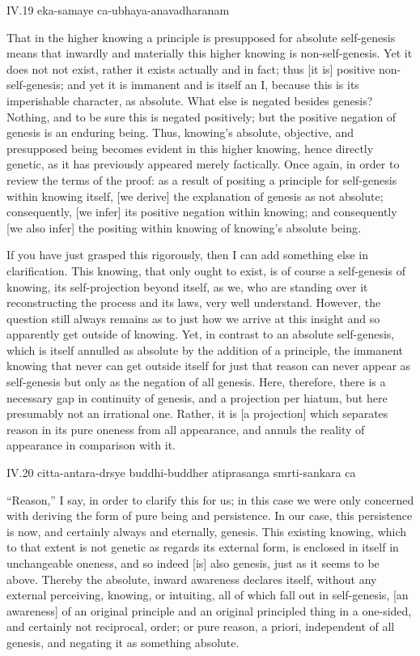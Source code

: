 IV.19
eka-samaye ca-ubhaya-anavadharanam

That in the higher knowing
a principle is presupposed for absolute self-genesis
means that inwardly and materially
this higher knowing is non-self-genesis.
Yet it does not not exist,
rather it exists actually and in fact;
thus [it is] positive non-self-genesis;
and yet it is immanent and is itself an I,
because this is its imperishable character, as absolute.
What else is negated besides genesis?
Nothing, and to be sure this is negated positively;
but the positive negation of genesis is an enduring being.
Thus, knowing's absolute, objective,
and presupposed being becomes evident
in this higher knowing, hence directly genetic,
as it has previously appeared merely factically.
Once again, in order to review the terms of the proof:
as a result of positing a principle
for self-genesis within knowing itself,
[we derive] the explanation of genesis as not absolute;
consequently, [we infer] its positive negation within knowing;
and consequently [we also infer] the positing within knowing
of knowing's absolute being.

If you have just grasped this rigorously,
then I can add something else in clarification.
This knowing, that only ought to exist, is of course
a self-genesis of knowing, its self-projection beyond itself,
as we, who are standing over it reconstructing
the process and its laws, very well understand.
However, the question still always remains as
to just how we arrive at this insight
and so apparently get outside of knowing.
Yet, in contrast to an absolute self-genesis,
which is itself annulled as absolute
by the addition of a principle,
the immanent knowing that never can get outside itself
for just that reason can never appear as self-genesis
but only as the negation of all genesis.
Here, therefore, there is a necessary gap
in continuity of genesis,
and a projection per hiatum,
but here presumably not an irrational one.
Rather, it is [a projection] which separates
reason in its pure oneness from all appearance,
and annuls the reality of appearance in comparison with it.

IV.20
citta-antara-drsye buddhi-buddher atiprasanga smrti-sankara ca

“Reason,” I say, in order to clarify this for us;
in this case we were only concerned with deriving
the form of pure being and persistence.
In our case, this persistence is now,
and certainly always and eternally, genesis.
This existing knowing, which to that extent
is not genetic as regards its external form,
is enclosed in itself in unchangeable oneness,
and so indeed [is] also genesis,
just as it seems to be above.
Thereby the absolute, inward awareness declares itself,
without any external perceiving, knowing, or intuiting,
all of which fall out in self-genesis,
[an awareness] of an original principle
and an original principled thing
in a one-sided, and certainly not reciprocal, order;
or pure reason, a priori,
independent of all genesis,
and negating it as something absolute.

